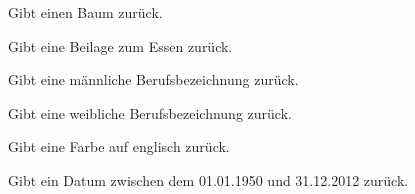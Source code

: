 \documentclass[a4paper,12pt,oneside]{sphinxmanual}
\begin{document}

\begin{fulllineitems}
\label{funktionen:pyzufall.baum}
Gibt einen Baum zurück.

\end{fulllineitems}


\begin{fulllineitems}
\label{funktionen:pyzufall.beilage}
Gibt eine Beilage zum Essen zurück.

\end{fulllineitems}


\begin{fulllineitems}
\label{funktionen:pyzufall.beruf_m}
Gibt eine männliche Berufsbezeichnung zurück.

\end{fulllineitems}


\begin{fulllineitems}
\label{funktionen:pyzufall.beruf_w}
Gibt eine weibliche Berufsbezeichnung zurück.

\end{fulllineitems}


\begin{fulllineitems}
\label{funktionen:pyzufall.color}
Gibt eine Farbe auf englisch zurück.

\end{fulllineitems}


\begin{fulllineitems}
\label{funktionen:pyzufall.datum}
Gibt ein Datum zwischen dem 01.01.1950 und 31.12.2012 zurück.

\end{fulllineitems}

\end{document}
